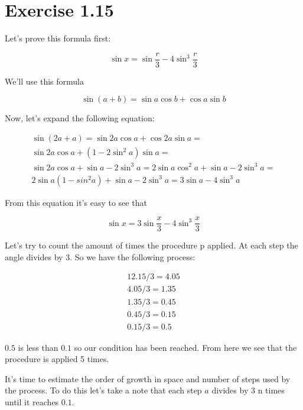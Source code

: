 \section*{Exercise 1.15}

Let's prove this formula first:

\begin{equation}
	\sin x = \sin \frac {r} {3} - 4 \sin^3 \frac {r} {3}
\end{equation}

We'll use this formula

\begin{equation}
	\sin (a+b) = \sin a \cos b + \cos a \sin b
\end{equation}

Now, let's expand the following equation:

\begin{gather}
	\sin(2a+a) = \sin 2a \cos a + \cos 2a \sin a = \\
	\sin 2a \cos a + \left(1 - 2 \sin^2 a\right) \sin a = \\
	\sin 2a \cos a + \sin a - 2 \sin^3 a = 
	2 \sin a \cos^2 a + \sin a - 2 \sin^3 a = \\
	2 \sin a \left(1 - sin^2 a\right) + \sin a - 2 \sin^3 a = 
	3 \sin a - 4 \sin^3 a
\end{gather}

From this equation it's easy to see that

\begin{equation}
	\sin x = 3 \sin \frac {x} {3} - 4 \sin^3 \frac {x} {3}
\end{equation}

Let's try to count the amount of times the procedure p applied. At each step the angle divides by 3. So we have the following process:

\[
\begin{aligned}
	12.15 / 3 = 4.05 \\
	4.05 / 3 = 1.35 \\
	1.35 / 3 = 0.45 \\
	0.45 / 3 = 0.15 \\
	0.15 / 3 = 0.5
\end{aligned}
\]

$0.5$ is less than $0.1$ so our condition has been reached. From here we see that the procedure is applied 5 times.

It's time to estimate the order of growth in space and number of steps used by the process. To do this let's take a note that each step $a$ divides by $3$ n times until it reaches $0.1$.

